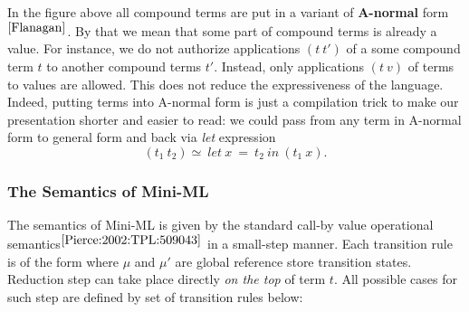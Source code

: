 \documentclass[a4paper,11pt,oneside]{article}
\theoremstyle{plain}
\begin{document}
	In the figure above all compound terms are put in a variant of \textbf{A-normal} form$^{\cite{Flanagan}}$. 
	By that we mean that some part of compound terms is already a value. 
	For instance, we do not authorize applications $(t~t')$ of a some compound term $t$ to another compound terms $t'$.
	Instead, only applications $(t~v)$ of terms to values are allowed. 
	 This does not reduce the expressiveness of the language. 
	 Indeed, putting terms into A-normal form is just a compilation trick to make our presentation shorter and easier to read: 
	 we could pass from any term in A-normal form to general form and back via \textit{let} expression 
	 $$(t_1~t_2) \simeq~let~x~=~t_2~in~(t_1~x).$$
	
	
\subsubsection*{The Semantics of Mini-ML }
	The semantics of Mini-ML is given by the standard call-by value operational semantics{\footnotesize$^{ \cite[p.~54]{Pierce:2002:TPL:509043}}$} in a small-step manner.  
	Each transition rule is of the form  where $\mu$ and $\mu'$ are global reference store transition states. 
	Reduction step can take place directly \textit{on the top} of term $t$. All possible cases for such step are defined by set of transition rules below:
\end{document}
